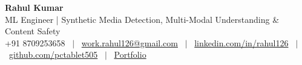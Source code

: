 \documentclass[10pt, letterpaper]{article}
\begin{document}
\begin{center}
    {\Huge \textbf{\color{midnightblue} Rahul Kumar}} \\ \vspace{4pt}
    {\Large \textmd{ML Engineer | Synthetic Media Detection, Multi-Modal Understanding \& Content Safety}} \\ \vspace{4pt}
    \small 
    +91 8709253658 \ $|$ \ 
    \href{mailto:work.rahul126@gmail.com}{work.rahul126@gmail.com} \ $|$ \ 
    \href{https://www.linkedin.com/in/rahul126/}{linkedin.com/in/rahul126} \ $|$ \ 
    \href{https://github.com/pctablet505}{github.com/pctablet505} \ $|$ \ 
    \href{https://github.com/pctablet505/portfolio/}{Portfolio}
\end{center}

\end{document}
